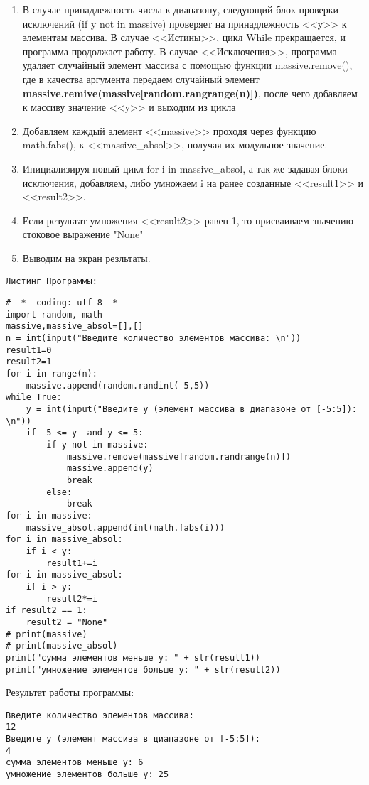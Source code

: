 \documentclass[a4paper]{article}
\begin{document}
\begin{lab4}
\begin{algoritm}
\begin{enumerate}
            \item 
                В случае принадлежность числа к диапазону, следующий блок проверки исключений (if y not in massive) проверяет на принадлежность <<y>> к элементам массива. В случае <<Истины>>, цикл While прекращается, и программа продолжает работу. В случае <<Исключения>>, программа удаляет случайный элемент массива с помощью функции massive.remove(\underline{\hspace{1mm}}), где в качества аргумента передаем случайный элемент \textbf{massive.remive(massive[random.rangrange(n)])}, после чего добавляем к массиву значение <<y>> и выходим из цикла
            \item 
                Добавляем каждый элемент <<massive>> проходя через функцию math.fabs(), к <<massive\_absol>>, получая их модульное значение.
            \item
                Инициализируя новый цикл for i in massive\_absol, а так же задавая блоки исключения, добавляем, либо умножаем i на ранее созданные <<result1>> и <<result2>>.
            \item
                Если результат умножения <<result2>> равен 1, то присваиваем значению стоковое выражение "None"
            \item
                Выводим на экран резльтаты.
        \end{enumerate}
    \end{algoritm}
        \texttt{Листинг Программы:}
    \begin{verbatim}
# -*- coding: utf-8 -*-
import random, math
massive,massive_absol=[],[]
n = int(input("Введите количество элементов массива: \n"))
result1=0
result2=1
for i in range(n):
    massive.append(random.randint(-5,5))
while True:
    y = int(input("Введите y (элемент массива в диапазоне от [-5:5]): \n"))
    if -5 <= y  and y <= 5:
        if y not in massive:
            massive.remove(massive[random.randrange(n)])
            massive.append(y)
            break
        else:
            break
for i in massive:
    massive_absol.append(int(math.fabs(i)))
for i in massive_absol:
    if i < y:
        result1+=i
for i in massive_absol:
    if i > y:
        result2*=i
if result2 == 1:
    result2 = "None"
# print(massive)
# print(massive_absol)
print("сумма элементов меньше y: " + str(result1))
print("умножение элементов больше y: " + str(result2))
    \end{verbatim}
    \begin{center}
        Результат работы программы:
    \end{center}
    \begin{verbatim}
Введите количество элементов массива: 
12
Введите y (элемент массива в диапазоне от [-5:5]): 
4
сумма элементов меньше y: 6
умножение элементов больше y: 25
    \end{verbatim}
    \end{lab4}
    
\end{document}
